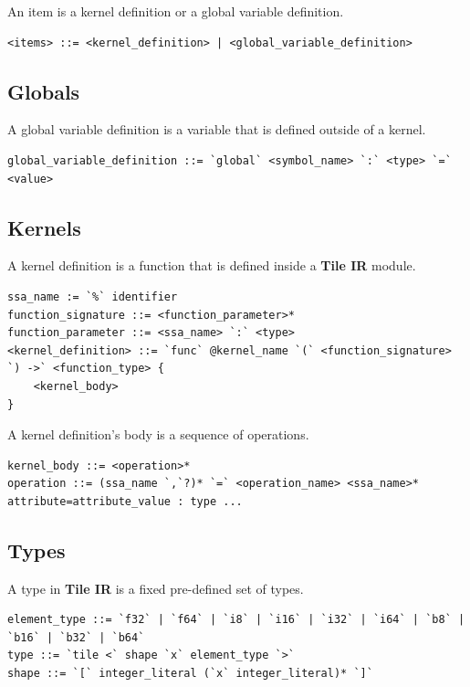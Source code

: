 \documentclass{article}
\begin{document}
An item is a kernel definition or a global variable definition.


\begin{lstlisting}
<items> ::= <kernel_definition> | <global_variable_definition>
\end{lstlisting}


\subsection{Globals}

A global variable definition is a variable that is defined outside of a kernel.


\begin{lstlisting}
global_variable_definition ::= `global` <symbol_name> `:` <type> `=` <value>
\end{lstlisting}


\subsection{Kernels}

A kernel definition is a function that is defined inside a \textbf{Tile IR} module.


\begin{lstlisting}
ssa_name := `%` identifier
function_signature ::= <function_parameter>*
function_parameter ::= <ssa_name> `:` <type>
<kernel_definition> ::= `func` @kernel_name `(` <function_signature> `) ->` <function_type> {
    <kernel_body>
}
\end{lstlisting}

A kernel definition's body is a sequence of operations.


\begin{lstlisting}
kernel_body ::= <operation>*
operation ::= (ssa_name `,`?)* `=` <operation_name> <ssa_name>* attribute=attribute_value : type ...
\end{lstlisting}


\subsection{Types}

A type in \textbf{Tile IR} is a fixed pre-defined set of types.


\begin{lstlisting}
element_type ::= `f32` | `f64` | `i8` | `i16` | `i32` | `i64` | `b8` | `b16` | `b32` | `b64`
type ::= `tile <` shape `x` element_type `>`
shape ::= `[` integer_literal (`x` integer_literal)* `]`
\end{lstlisting}
\end{document}
